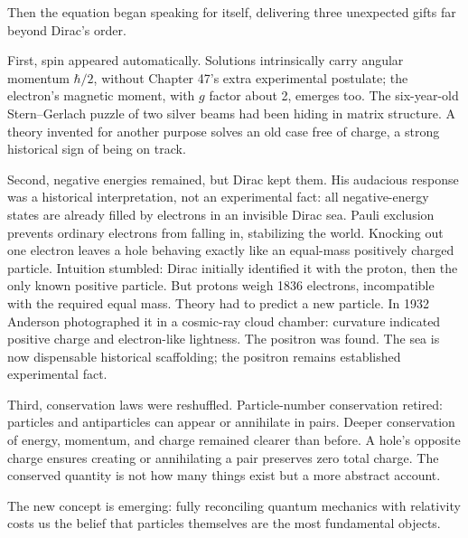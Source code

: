 Then the equation began speaking for itself, delivering three unexpected gifts far beyond Dirac's order.

First, spin appeared automatically. Solutions intrinsically carry angular momentum \(\hbar/2\), without Chapter 47's extra experimental postulate; the electron's magnetic moment, with \(g\) factor about 2, emerges too. The six-year-old Stern--Gerlach puzzle of two silver beams had been hiding in matrix structure. A theory invented for another purpose solves an old case free of charge, a strong historical sign of being on track.

Second, negative energies remained, but Dirac kept them. His audacious response was a historical interpretation, not an experimental fact: all negative-energy states are already filled by electrons in an invisible Dirac sea. Pauli exclusion prevents ordinary electrons from falling in, stabilizing the world. Knocking out one electron leaves a hole behaving exactly like an equal-mass positively charged particle. Intuition stumbled: Dirac initially identified it with the proton, then the only known positive particle. But protons weigh 1836 electrons, incompatible with the required equal mass. Theory had to predict a new particle. In 1932 Anderson photographed it in a cosmic-ray cloud chamber: curvature indicated positive charge and electron-like lightness. The positron was found. The sea is now dispensable historical scaffolding; the positron remains established experimental fact.

Third, conservation laws were reshuffled. Particle-number conservation retired: particles and antiparticles can appear or annihilate in pairs. Deeper conservation of energy, momentum, and charge remained clearer than before. A hole's opposite charge ensures creating or annihilating a pair preserves zero total charge. The conserved quantity is not how many things exist but a more abstract account.

The new concept is emerging: fully reconciling quantum mechanics with relativity costs us the belief that particles themselves are the most fundamental objects.
